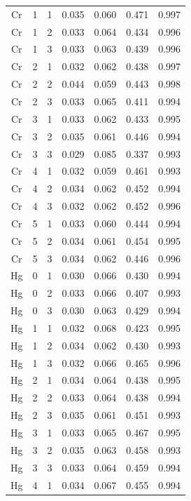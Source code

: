 \documentclass[ms, hidelinks]{uncgdissertationexp3}
\theoremstyle{plain}
\theoremstyle{definition}
\theoremstyle{remark}
\begin{document}
\begin{longtable}{ccccccc}
  Cr & 1 & 1 & 0.035 & 0.060 & 0.471 & 0.997\\
  \rowcolor{gray!6}  Cr & 1 & 2 & 0.033 & 0.064 & 0.434 & 0.996\\
  Cr & 1 & 3 & 0.033 & 0.063 & 0.439 & 0.996\\
  \rowcolor{gray!6}  Cr & 2 & 1 & 0.032 & 0.062 & 0.438 & 0.997\\
  Cr & 2 & 2 & 0.044 & 0.059 & 0.443 & 0.998\\
  \rowcolor{gray!6}  Cr & 2 & 3 & 0.033 & 0.065 & 0.411 & 0.994\\
  Cr & 3 & 1 & 0.033 & 0.062 & 0.433 & 0.995\\
  \rowcolor{gray!6}  Cr & 3 & 2 & 0.035 & 0.061 & 0.446 & 0.994\\
  Cr & 3 & 3 & 0.029 & 0.085 & 0.337 & 0.993\\
  \rowcolor{gray!6}  Cr & 4 & 1 & 0.032 & 0.059 & 0.461 & 0.993\\
  Cr & 4 & 2 & 0.034 & 0.062 & 0.452 & 0.994\\
  \rowcolor{gray!6}  Cr & 4 & 3 & 0.032 & 0.062 & 0.452 & 0.996\\
  Cr & 5 & 1 & 0.033 & 0.060 & 0.444 & 0.994\\
  \rowcolor{gray!6}  Cr & 5 & 2 & 0.034 & 0.061 & 0.454 & 0.995\\
  Cr & 5 & 3 & 0.034 & 0.062 & 0.446 & 0.996\\
  \rowcolor{gray!6}  Hg & 0 & 1 & 0.030 & 0.066 & 0.430 & 0.994\\
  Hg & 0 & 2 & 0.033 & 0.066 & 0.407 & 0.993\\
  \rowcolor{gray!6}  Hg & 0 & 3 & 0.030 & 0.063 & 0.429 & 0.994\\
  Hg & 1 & 1 & 0.032 & 0.068 & 0.423 & 0.995\\
  \rowcolor{gray!6}  Hg & 1 & 2 & 0.034 & 0.062 & 0.430 & 0.993\\
  Hg & 1 & 3 & 0.032 & 0.066 & 0.465 & 0.996\\
  \rowcolor{gray!6}  Hg & 2 & 1 & 0.034 & 0.064 & 0.438 & 0.995\\
  Hg & 2 & 2 & 0.033 & 0.064 & 0.438 & 0.994\\
  \rowcolor{gray!6}  Hg & 2 & 3 & 0.035 & 0.061 & 0.451 & 0.993\\
  Hg & 3 & 1 & 0.033 & 0.065 & 0.467 & 0.995\\
  \rowcolor{gray!6}  Hg & 3 & 2 & 0.035 & 0.063 & 0.458 & 0.993\\
  Hg & 3 & 3 & 0.033 & 0.064 & 0.459 & 0.994\\
  \rowcolor{gray!6}  Hg & 4 & 1 & 0.034 & 0.067 & 0.455 & 0.994\\

\end{longtable}
\end{document}

